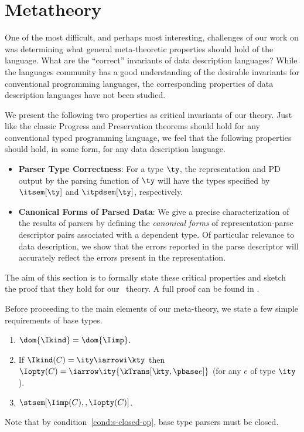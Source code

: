 \section{Metatheory}
\label{sec:ddc-meta-theory}

One of the most difficult, and perhaps most interesting, challenges of our
work on \ddc{} was determining what general
meta-theoretic properties should hold of the language. What are the ``correct''
invariants of data description languages?  While the languages
community has a good understanding of the
desirable invariants for conventional programming languages, the
corresponding properties of data description languages have not been
studied.

We present the following two properties as critical invariants of
our theory.  Just like the classic Progress and Preservation theorems
should hold for any conventional typed programming language,
we feel that the following properties should hold, in some form, for any data
description language.
\begin{itemize}
\item {\bf Parser Type Correctness}: For a \ddc{} type $\ty$, the
  representation and PD output by the parsing function of $\ty$ will
  have the types specified by $\itsem[\ty]$ and
  $\itpdsem[\ty]$, respectively.
  
\item {\bf Canonical Forms of Parsed Data}: We give a precise
  characterization of the results of parsers by defining the {\em
    canonical forms} of representation-parse descriptor pairs
  associated with a dependent \ddc{} type. Of particular relevance to
  data description, we show that the errors reported in the parse
  descriptor will accurately reflect the errors present in the
  representation.
\end{itemize}
\noindent
The aim of this section is to formally state these
critical properties and sketch the proof that they hold for 
our \ddc\ theory. A full proof can be found in . 

Before proceeding to the main elements of our meta-theory, 
we state a few simple requirements
of \ddc{} base types. 
\begin{condition}
\label{cond:s-base-types}
  \begin{enumerate}
  \item $\dom {\Ikind} = \dom {\Iimp}$.
  \item If $\Ikind(C) = {\ity \iarrowi \kty}$ then $\Iopty(C) =
    \iarrow \ity {\kTrans[\kty,\pbase e]}$ (for any $e$ of type $\ity$).
  \item $\stsem[\Iimp(C),,\Iopty(C)]$.
    \label{cond:s-closed-op}
  \end{enumerate}
\end{condition}
\noindent
Note that by
condition~\ref{cond:s-closed-op}, base type parsers must be closed.


